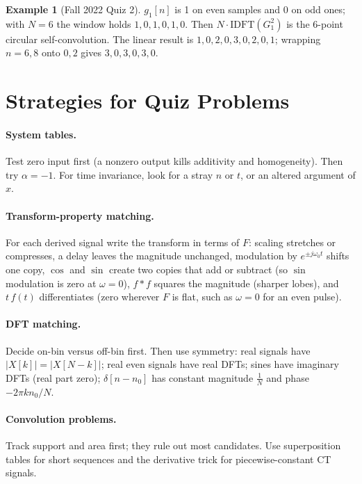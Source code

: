 \documentclass[11pt]{article}
\numberwithin{equation}{section}
\theoremstyle{definition}
\newtheorem{example}{Example}[section]
\theoremstyle{remark}
\begin{document}
\begin{example}[Fall 2022 Quiz 2]
$g_1[n]$ is 1 on even samples and 0 on odd ones; with $N=6$ the window holds $1,0,1,0,1,0$. Then
$N\cdot\mathrm{IDFT}(G_1^2)$ is the 6-point circular self-convolution. The linear result is
$1,0,2,0,3,0,2,0,1$; wrapping $n=6,8$ onto $0,2$ gives $3,0,3,0,3,0$.
\end{example}

\section{Strategies for Quiz Problems}

\paragraph{System tables.} Test zero input first (a nonzero output kills additivity and
homogeneity). Then try $\alpha=-1$. For time invariance, look for a stray $n$ or $t$, or an altered
argument of $x$.

\paragraph{Transform-property matching.} For each derived signal write the transform in terms of
$F$: scaling stretches or compresses, a delay leaves the magnitude unchanged, modulation by
$e^{\pm j\omega_0t}$ shifts one copy, $\cos$ and $\sin$ create two copies that add or subtract (so
$\sin$ modulation is zero at $\omega=0$), $f*f$ squares the magnitude (sharper lobes), and $t\,f(t)$
differentiates (zero wherever $F$ is flat, such as $\omega=0$ for an even pulse).

\paragraph{DFT matching.} Decide on-bin versus off-bin first. Then use symmetry: real signals have
$|X[k]|=|X[N-k]|$; real even signals have real DFTs; sines have imaginary DFTs (real part zero);
$\delta[n-n_0]$ has constant magnitude $\frac1N$ and phase $-2\pi kn_0/N$.

\paragraph{Convolution problems.} Track support and area first; they rule out most candidates.
Use superposition tables for short sequences and the derivative trick for piecewise-constant CT
signals.
\end{document}
